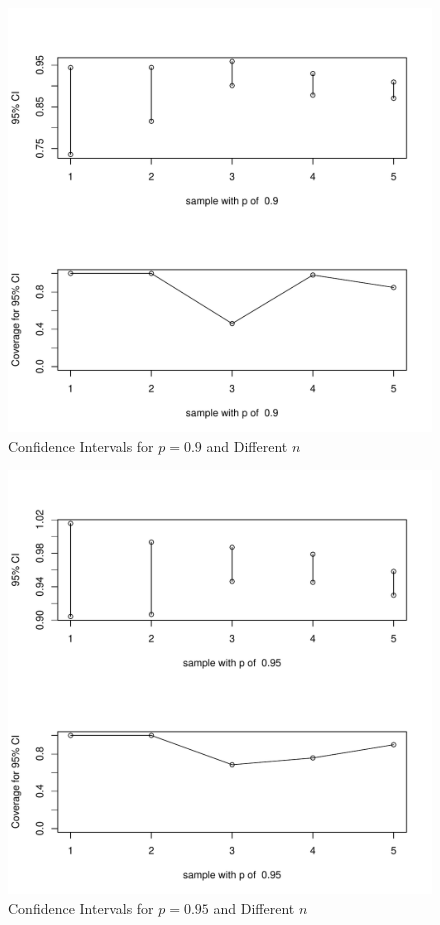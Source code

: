 \documentclass[12pt,letterpaper,titlepage,en-US]{article}
\begin{document}
\begin{figure}[H]
    \caption{Confidence Intervals for $p = 0.9$ and Different $n$}
    \label{sndp}
    \centering
    \includegraphics[width=.9\textwidth]{figure/sameP09.pdf}
\end{figure}
\begin{figure}[H]
    \caption{Confidence Intervals for $p = 0.95$ and Different $n$}
    \label{sndp}
    \centering
    \includegraphics[width=.9\textwidth]{figure/sameP095.pdf}
\end{figure}
\end{document}
